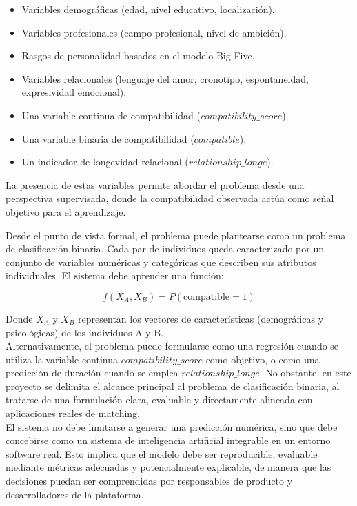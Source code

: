 \begin{itemize}
    \item Variables demográficas (edad, nivel educativo, localización).
    \item Variables profesionales (campo profesional, nivel de ambición).
    \item Rasgos de personalidad basados en el modelo Big Five.
    \item Variables relacionales (lenguaje del amor, cronotipo, espontaneidad, expresividad emocional).
    \item Una variable continua de compatibilidad ($compatibility\_score$).
    \item Una variable binaria de compatibilidad ($compatible$).
    \item Un indicador de longevidad relacional ($relationship\_longe$).
\end{itemize}

La presencia de estas variables permite abordar el problema desde una perspectiva supervisada, donde la compatibilidad observada actúa como señal objetivo para el aprendizaje.

Desde el punto de vista formal, el problema puede plantearse como un problema de clasificación binaria. Cada par de individuos queda caracterizado por un conjunto de variables numéricas y categóricas que describen sus atributos individuales. El sistema debe aprender una función:

$$f(X_A, X_B) = P(\text{compatible} = 1)$$

Donde $X_A$ y $X_B$ representan los vectores de características (demográficas y psicológicas) de los individuos A y B.\\

Alternativamente, el problema puede formularse como una regresión cuando se utiliza la variable continua $compatibility\_score$ como objetivo, o como una predicción de duración cuando se emplea $relationship\_longe$. No obstante, en este proyecto se delimita el alcance principal al problema de clasificación binaria, al tratarse de una formulación clara, evaluable y directamente alineada con aplicaciones reales de matching.\\

El sistema no debe limitarse a generar una predicción numérica, sino que debe concebirse como un sistema de inteligencia artificial integrable en un entorno software real. Esto implica que el modelo debe ser reproducible, evaluable mediante métricas adecuadas y potencialmente explicable, de manera que las decisiones puedan ser comprendidas por responsables de producto y desarrolladores de la plataforma.\\

